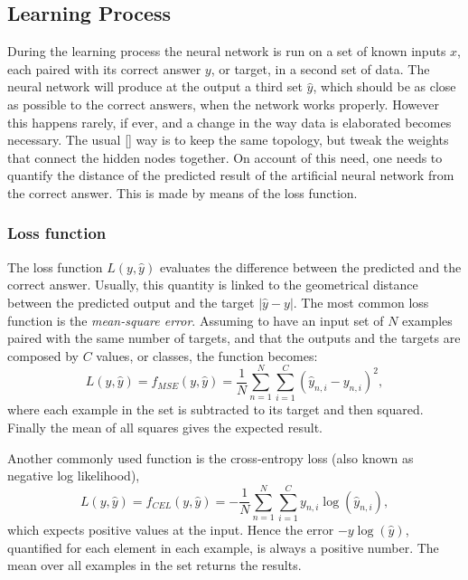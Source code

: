 \subsection{Learning Process}
\label{ssec:Learning_Process}
During the learning process the neural network is run on a set of known inputs $x$, each paired with its correct answer $y$, or target, in a second set of data.
The neural network will produce at the output a third set $\hat{y}$, which should be as close as possible to the correct answers, when the network works properly.
However this happens rarely, if ever, and a change in the way data is elaborated becomes necessary.
The usual \ref{} way is to keep the same topology, but tweak the weights that connect the hidden nodes together.
On account of this need, one needs to quantify the distance of the predicted result of the artificial neural network from the correct answer.
This is made by means of the loss function.

\subsubsection{Loss function}
\label{sssec:Loss_function}
The loss function $L(y, \hat{y})$ evaluates the difference between the predicted and the correct answer.
Usually, this quantity is linked to the geometrical distance between the predicted output and the target $\left| \hat{y}-y \right|$.
The most common loss function is the \textit{mean-square error}.
Assuming to have an input set of $N$ examples paired with the same number of targets, and that the outputs and the targets are composed by $C$ values, or classes, the function becomes:
\begin{equation}
	L(y, \hat{y}) = f_{MSE}(y, \hat{y}) = \frac{1}{N} \sum_{n=1}^N \sum_{i=1}^C \left( \hat{y}_{n,i} - y_{n,i} \right)^2,
\end{equation}
where each example in the set is subtracted to its target and then squared.
Finally the mean of all squares gives the expected result.

Another commonly used function is the cross-entropy loss (also known as negative log likelihood),
\begin{equation}
	L(y, \hat{y}) = f_{CEL}(y, \hat{y}) = - \frac{1}{N} \sum_{n=1}^N \sum_{i=1}^C y_{n,i} \log \left( \hat{y}_{n,i} \right),
\end{equation}
which expects positive values at the input.
Hence the error $-y\log \left( \hat{y} \right)$, quantified for each element in each example, is always a positive number.
The mean over all examples in the set returns the results.

